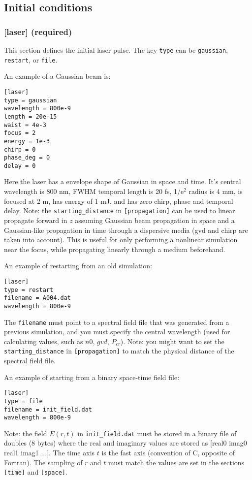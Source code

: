 \documentclass{article}
\begin{document}
\subsection{Initial conditions}
\subsubsection{[laser] (required)}
This section defines the initial laser pulse. The key \texttt{type}
can be \texttt{gaussian}, \texttt{restart}, or \texttt{file}.

An example of a Gaussian beam is:
\begin{lstlisting}
[laser]
type = gaussian
wavelength = 800e-9
length = 20e-15
waist = 4e-3
focus = 2
energy = 1e-3
chirp = 0
phase_deg = 0
delay = 0
\end{lstlisting}
Here the laser has a envelope shape of Gaussian in space and
time. It's central wavelength is 800 nm, FWHM temporal length is 20
fs, 1/e$^2$ radius is 4 mm, is focused at 2 m, has energy of 1 mJ, and
has zero chirp, phase and temporal delay. Note: the
\texttt{starting\_distance} in \texttt{[propagation]} can be used to
linear propagate forward in $z$ assuming Gaussian beam propagation in
space and a Gaussian-like propagation in time through a dispersive
media (gvd and chirp are taken into account). This is useful for only
performing a nonlinear simulation near the focus, while propagating
linearly through a medium beforehand.

An example of restarting from an old simulation:
\begin{lstlisting}
[laser]
type = restart
filename = A004.dat
wavelength = 800e-9
\end{lstlisting}
The \texttt{filename} must point to a spectral field file that was
generated from a previous simulation, and you must specify the central
wavelength (used for calculating values, such as $n0$, $gvd$,
$P_{cr}$). Note: you might want to set the \texttt{starting\_distance}
in \texttt{[propagation]} to match the physical distance of the
spectral field file.

An example of starting from a binary space-time field file:
\begin{lstlisting}
[laser]
type = file
filename = init_field.dat
wavelength = 800e-9
\end{lstlisting}
Note: the field $E(r,t)$ in \texttt{init\_field.dat} must be stored in
a binary file of doubles (8 bytes) where the real and imaginary values
are stored as [real0 imag0 real1 imag1 ...]. The time axis $t$ is the
fast axis (convention of C, opposite of Fortran). The sampling of $r$
and $t$ must match the values are set in the sections \texttt{[time]}
and \texttt{[space]}.
\end{document}
